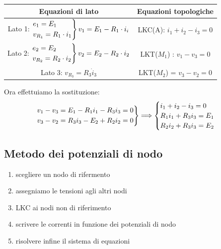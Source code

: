 \documentclass{article}
\begin{document}
\begin{center}
\begin{tabular}{c|c}
    Equazioni di lato & Equazioni topologiche\\
    \hline
    Lato 1:
    $
    \begin{rcases}
        e_1=E_1\\
        v_{R_1} = R_1 \cdot i_1 
    \end{rcases}
    v_1 = E_1 - R_1 \cdot i_i$
    &
    LKC(A): $i_1+i_2-i_3=0$\\
    Lato 2: 
    $
    \begin{rcases}
        e_2 = E_2\\
        v_{R_2} = R_2 \cdot i_2
    \end{rcases}
    v_2 = E_2 - R_2 \cdot i_2
    $
    &
    LKT($M_1$) : $v_1 - v_3=0$\\
    Lato 3: $v_{R_3} = R_3 \dot i_3$ 
    &
    LKT($M_2$) = $v_3-v_2=0$    
\end{tabular}
\end{center}
Ora effettuiamo la sostituzione:
\[
    \begin{rcases}
        v_1 - v_3 = E_1-R_1i_1 - R_3i_3=0\\
        v_3 - v_2 = R_3i_3 - E_2 + R_2i_2=0
    \end{rcases}
    \Longrightarrow
    \begin{cases}
        i_1+i_2-i_3=0\\
        R_1i_1+R_3i_3=E_1\\
        R_2i_2+R_3i_3=E_2
    \end{cases}
\]







\subsection{Metodo dei potenziali di nodo}
\begin{enumerate}
    \item scegliere un nodo di rifermento
    \item assegniamo le tensioni agli altri nodi
    \item LKC ai nodi non di riferimento
    \item scrivere le correnti in funzione dei potenziali di nodo
    \item risolvere infine il sistema di equazioni
\end{enumerate}
\end{document}
